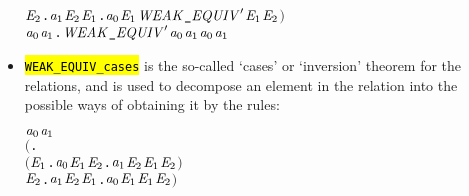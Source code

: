 \begin{itemize}
\begin{alltt}
        \HOLSymConst{\HOLTokenForall{}}\ensuremath{\HOLBoundVar{E}\sb{\mathrm{2}}}. \ensuremath{\HOLBoundVar{a}\sb{\mathrm{1}}} \HOLTokenTransBegin\HOLSymConst{\ensuremath{\tau}}\HOLTokenTransEnd \ensuremath{\HOLBoundVar{E}\sb{\mathrm{2}}} \HOLSymConst{\HOLTokenImp{}} \HOLSymConst{\HOLTokenExists{}}\ensuremath{\HOLBoundVar{E}\sb{\mathrm{1}}}. \ensuremath{\HOLBoundVar{a}\sb{\mathrm{0}}} \HOLSymConst{\HOLTokenEPS} \ensuremath{\HOLBoundVar{E}\sb{\mathrm{1}}} \HOLSymConst{\HOLTokenConj{}} \ensuremath{\HOLFreeVar{WEAK\HOLTokenUnderscore{}EQUIV}\sp{\prime}} \ensuremath{\HOLBoundVar{E}\sb{\mathrm{1}}} \ensuremath{\HOLBoundVar{E}\sb{\mathrm{2}}}\ensuremath{)} \HOLSymConst{\HOLTokenImp{}}
   \HOLSymConst{\HOLTokenForall{}}\ensuremath{\HOLBoundVar{a}\sb{\mathrm{0}}} \ensuremath{\HOLBoundVar{a}\sb{\mathrm{1}}}. \ensuremath{\HOLFreeVar{WEAK\HOLTokenUnderscore{}EQUIV}\sp{\prime}} \ensuremath{\HOLBoundVar{a}\sb{\mathrm{0}}} \ensuremath{\HOLBoundVar{a}\sb{\mathrm{1}}} \HOLSymConst{\HOLTokenImp{}} \ensuremath{\HOLBoundVar{a}\sb{\mathrm{0}}} \HOLSymConst{\HOLTokenWeakEQ} \ensuremath{\HOLBoundVar{a}\sb{\mathrm{1}}}
\end{alltt}
\item \hl{\texttt{WEAK_EQUIV_cases}} is the so-called `cases' or `inversion' theorem for
  the relations, and is used to decompose an element in the relation into the possible ways of
  obtaining it by the rules:
\begin{alltt}
\HOLTokenTurnstile{} \ensuremath{\HOLFreeVar{a}\sb{\mathrm{0}}} \HOLSymConst{\HOLTokenWeakEQ} \ensuremath{\HOLFreeVar{a}\sb{\mathrm{1}}} \HOLSymConst{\HOLTokenEquiv{}}
   \ensuremath{(}\HOLSymConst{\HOLTokenForall{}}.
        \ensuremath{(}\HOLSymConst{\HOLTokenForall{}}\ensuremath{\HOLBoundVar{E}\sb{\mathrm{1}}}. \ensuremath{\HOLFreeVar{a}\sb{\mathrm{0}}} \HOLTokenTransBegin{} \HOLTokenTransEnd \ensuremath{\HOLBoundVar{E}\sb{\mathrm{1}}} \HOLSymConst{\HOLTokenImp{}} \HOLSymConst{\HOLTokenExists{}}\ensuremath{\HOLBoundVar{E}\sb{\mathrm{2}}}. \ensuremath{\HOLFreeVar{a}\sb{\mathrm{1}}} \HOLTokenWeakTransBegin{} \HOLTokenWeakTransEnd \ensuremath{\HOLBoundVar{E}\sb{\mathrm{2}}} \HOLSymConst{\HOLTokenConj{}} \ensuremath{\HOLBoundVar{E}\sb{\mathrm{1}}} \HOLSymConst{\HOLTokenWeakEQ} \ensuremath{\HOLBoundVar{E}\sb{\mathrm{2}}}\ensuremath{)} \HOLSymConst{\HOLTokenConj{}}
        \HOLSymConst{\HOLTokenForall{}}\ensuremath{\HOLBoundVar{E}\sb{\mathrm{2}}}. \ensuremath{\HOLFreeVar{a}\sb{\mathrm{1}}} \HOLTokenTransBegin{} \HOLTokenTransEnd \ensuremath{\HOLBoundVar{E}\sb{\mathrm{2}}} \HOLSymConst{\HOLTokenImp{}} \HOLSymConst{\HOLTokenExists{}}\ensuremath{\HOLBoundVar{E}\sb{\mathrm{1}}}. \ensuremath{\HOLFreeVar{a}\sb{\mathrm{0}}} \HOLTokenWeakTransBegin{} \HOLTokenWeakTransEnd \ensuremath{\HOLBoundVar{E}\sb{\mathrm{1}}} \HOLSymConst{\HOLTokenConj{}} \ensuremath{\HOLBoundVar{E}\sb{\mathrm{1}}} \HOLSymConst{\HOLTokenWeakEQ} \ensuremath{\HOLBoundVar{E}\sb{\mathrm{2}}}\ensuremath{)} \HOLSymConst{\HOLTokenConj{}}

\end{alltt}
\end{itemize}
